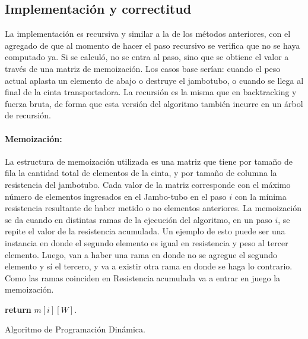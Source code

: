 \documentclass[10pt,a4paper]{article}
\begin{document}
\subsection{Implementación y correctitud}
La implementación es recursiva y similar a la de los métodos anteriores, con el agregado de que al momento de hacer el paso recursivo se verifica que no se haya computado ya. Si se calculó, no se entra al paso, sino que se obtiene el valor a través de una matriz de memoización. Los casos base serían: cuando el peso actual aplasta un elemento de abajo o destruye el jambotubo, o cuando se llega al final de la cinta transportadora. \newline 
La recursión es la misma que en backtracking y fuerza bruta, de forma que esta versión del algoritmo también incurre en un árbol de recursión.
\paragraph{Memoización:}
La estructura de memoización utilizada es una matriz que tiene por tamaño de fila la cantidad total de elementos de la cinta, y por tamaño de columna la resistencia del jambotubo. Cada valor de la matriz corresponde con el máximo número de elementos ingresados en el Jambo-tubo en el paso $i$ con la mínima resistencia resultante de haber metido o no elementos anteriores.
La memoización se da cuando en distintas ramas de la ejecución del algoritmo, en un paso $i$, se repite el valor de la resistencia acumulada. Un ejemplo de esto puede ser una instancia en donde el segundo elemento es igual en resistencia y peso al tercer elemento. Luego, van a haber una rama en donde no se agregue el segundo elemento y sí el tercero, y va a existir otra rama en donde se haga lo contrario. Como las ramas coinciden en Resistencia acumulada va a entrar en juego la memoización.
\begin{algorithm}
	\begin{algorithmic}[1]
		
		\EndIf

		\EndIf
		
		\EndIf
		
		\State \textbf{return} $m[i][W]$.
		
		\EndFunction
	\end{algorithmic}
	\caption{Algoritmo de Programación Dinámica.}
	\label{alg:dinamica}
\end{algorithm}
\end{document}
